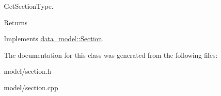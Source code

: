 Get\+Section\+Type. 

\begin{DoxyReturn}{Returns}

\end{DoxyReturn}


Implements \hyperlink{classdata__model_1_1_section_a06487a79e538e1849bb1838cf6a0875b}{data\+\_\+model\+::\+Section}.



The documentation for this class was generated from the following files\+:\begin{DoxyCompactItemize}
\item 
model/section.\+h\item 
model/section.\+cpp\end{DoxyCompactItemize}
